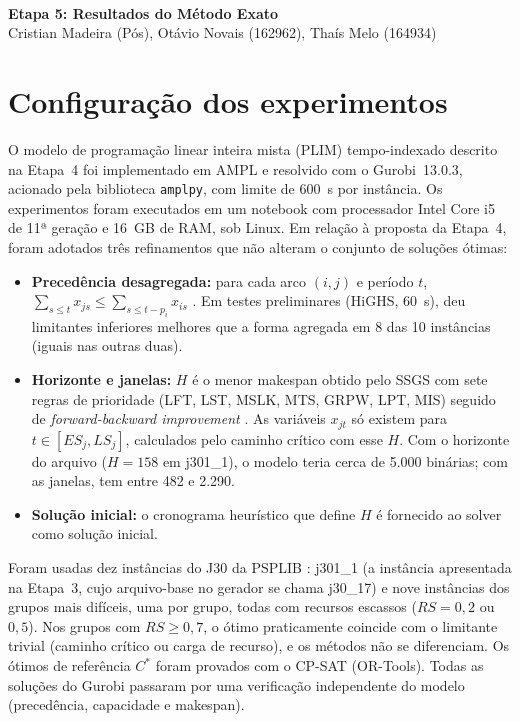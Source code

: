 \documentclass[11pt,a4paper]{article}
\begin{document}
\\[6pt]
{\bfseries Etapa 5: Resultados do Método Exato}\\
Cristian Madeira (Pós), Otávio Novais (162962), Thaís Melo (164934)

\section*{Configuração dos experimentos}

O modelo de programação linear inteira mista (PLIM) tempo-indexado descrito na Etapa~4
\cite{pritsker} foi implementado em AMPL e resolvido com o Gurobi~13.0.3, acionado pela
biblioteca \texttt{amplpy}, com limite de 600~s por instância. Os experimentos foram executados
em um notebook com processador Intel Core i5 de 11ª geração e 16~GB de RAM, sob Linux.
Em relação à proposta da Etapa~4, foram adotados três refinamentos que não alteram o conjunto
de soluções ótimas:

\begin{itemize}
  \item \textbf{Precedência desagregada:} para cada arco $(i,j)$ e período $t$,
        $\sum_{s \le t} x_{js} \le \sum_{s \le t-p_i} x_{is}$ \cite{christofides}. Em testes
        preliminares (HiGHS, 60~s), deu limitantes inferiores melhores que a forma agregada em 8 das
        10 instâncias (iguais nas outras duas).
  \item \textbf{Horizonte e janelas:} $H$ é o menor makespan obtido pelo SSGS com sete regras de
        prioridade (LFT, LST, MSLK, MTS, GRPW, LPT, MIS) seguido de \emph{forward-backward
        improvement} \cite{valls}. As variáveis $x_{jt}$ só existem para $t \in [ES_j, LS_j]$,
        calculados pelo caminho crítico com esse $H$. Com o horizonte do arquivo ($H = 158$ em
        j301\_1), o modelo teria cerca de 5.000 binárias; com as janelas, tem entre 482 e 2.290.
  \item \textbf{Solução inicial:} o cronograma heurístico que define $H$ é fornecido ao solver
        como solução inicial.
\end{itemize}

Foram usadas dez instâncias do J30 da PSPLIB \cite{psplib}: j301\_1 (a instância apresentada na
Etapa~3, cujo arquivo-base no gerador se chama j30\_17) e nove instâncias dos grupos mais difíceis,
uma por grupo, todas com recursos escassos ($RS = 0{,}2$ ou $0{,}5$). Nos grupos com $RS \ge 0{,}7$,
o ótimo praticamente coincide com o limitante trivial (caminho crítico ou carga de recurso), e os
métodos não se diferenciam. Os ótimos de referência $C^*$ foram provados com o CP-SAT (OR-Tools). Todas as
soluções do Gurobi passaram por uma verificação independente do modelo (precedência, capacidade e makespan).
\end{document}
